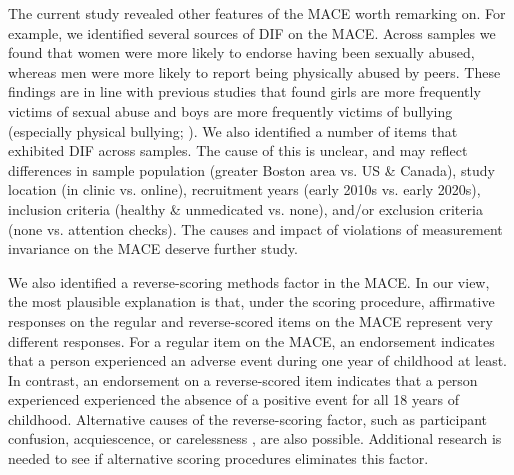 \documentclass[letterpaper,man,natbib,floatsintext,longtable]{apa6}
\begin{document}

The current study revealed other features of the MACE worth remarking on. For example, we identified several sources of DIF on the MACE. Across samples we found that women were more likely to endorse having been sexually abused, whereas men were more likely to report being physically abused by peers. These findings are in line with previous studies that found girls are more frequently victims of sexual abuse \citep{stoltenborgh2015prevalence} and boys are more frequently victims of bullying (especially physical bullying; \citealt{scheithauer2006physical}). We also identified a number of items that exhibited DIF across samples. The cause of this is unclear, and may reflect differences in sample population (greater Boston area vs. US \& Canada), study location (in clinic vs. online), recruitment years (early 2010s vs. early 2020s), inclusion criteria (healthy \& unmedicated vs. none), and/or exclusion criteria (none vs. attention checks). The causes and impact of violations of measurement invariance on the MACE deserve further study. 

We also identified a reverse-scoring methods factor in the MACE. In our view, the most plausible explanation is that, under the \cite{teicher2015maltreatment} scoring procedure, affirmative responses on the regular and reverse-scored items on the MACE represent very different responses. For a regular item on the MACE, an endorsement indicates that a person experienced an adverse event during one year of childhood at least. In contrast, an endorsement on a reverse-scored item indicates that a person experienced experienced the absence of a positive event for all 18 years of childhood. Alternative causes of the reverse-scoring factor, such as participant confusion, acquiescence, or carelessness \citep{weijters2013reversed}, are also possible. Additional research is needed to see if alternative scoring procedures eliminates this factor. 
\end{document}
